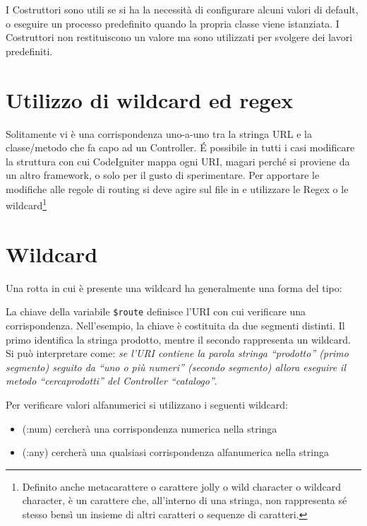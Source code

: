 I Costruttori sono utili se si ha la necessità di configurare alcuni valori di default, o eseguire un processo predefinito quando la propria classe viene istanziata. I Costruttori non restituiscono un valore ma sono utilizzati per svolgere dei lavori predefiniti.

\section{Utilizzo di wildcard ed regex}
Solitamente vi è una corrispondenza uno-a-uno tra la stringa \ac{URL} e la classe/metodo che fa capo ad un Controller. \'E possibile in tutti i casi modificare la struttura con cui CodeIgniter mappa ogni \ac{URI}, magari perché si proviene da un altro framework, o solo per il gusto di sperimentare. Per apportare le modifiche alle regole di routing si deve agire sul file  in  e utilizzare le Regex o le wildcard\footnote{Definito anche metacarattere o carattere jolly o wild character o wildcard character, è un carattere che, all'interno di una stringa, non rappresenta sé stesso bensì un insieme di altri caratteri o sequenze di caratteri.}

\section{Wildcard}
Una rotta in cui è presente una wildcard ha generalmente una forma del tipo:


La chiave della variabile \verb|$route| definisce l'\ac{URI} con cui verificare una corrispondenza. Nell'esempio, la chiave è costituita da due segmenti distinti. Il primo identifica la stringa prodotto, mentre il secondo rappresenta un wildcard. Si può interpretare come: \emph{se l'URI contiene la parola stringa ``prodotto'' (primo segmento) seguito da ``uno o più numeri'' (secondo segmento) allora eseguire il metodo ``cercaprodotti'' del Controller ``catalogo''}.

Per verificare valori alfanumerici si utilizzano i seguenti wildcard:

\begin{itemize}
\item (:num) cercherà una corrispondenza numerica nella stringa

\item (:any) cercherà una qualsiasi corrispondenza alfanumerica nella stringa
\end{itemize}

